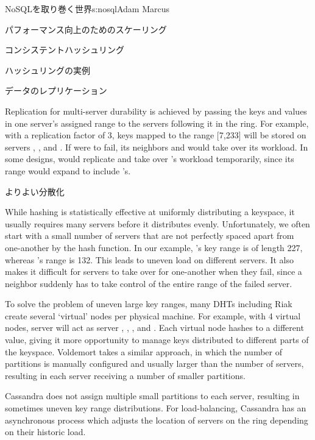 \begin{aosachapter}{NoSQLを取り巻く世界}{s:nosql}{Adam Marcus}
\begin{aosasect1}{パフォーマンス向上のためのスケーリング}
\begin{aosasect2}{コンシステントハッシュリング}
\begin{aosasect3}{ハッシュリングの実例}
\end{aosasect3}

\begin{aosasect3}{データのレプリケーション}

Replication for multi-server durability is achieved by passing the
keys and values in one server's assigned range to the servers
following it in the ring.  For example, with a replication factor of
3, keys mapped to the range [7,233] will be stored on servers
, , and .  If  were to fail, its
neighbors  and  would take over its workload.  In some designs,
 would replicate and take over 's workload temporarily, 
since its range would expand to include 's.

\end{aosasect3}

\begin{aosasect3}{よりよい分散化}

While hashing is statistically effective at uniformly distributing a
keyspace, it usually requires many servers before it distributes
evenly.  Unfortunately, we often start with a small number of servers
that are not perfectly spaced apart from one-another by the hash
function.  In our example, 's key range is of length 227,
whereas 's range is 132.  This leads to uneven load on
different servers.  It also makes it difficult for servers to take
over for one-another when they fail, since a neighbor suddenly has to
take control of the entire range of the failed server.

To solve the problem of uneven large key ranges, many DHTs including
Riak create several `virtual' nodes per physical machine.  For
example, with 4 virtual nodes, server  will act as server
, , , and .  Each virtual
node hashes to a different value, giving it more opportunity to manage
keys distributed to different parts of the keyspace.  Voldemort takes
a similar approach, in which the number of partitions is manually
configured and usually larger than the number of servers, resulting in
each server receiving a number of smaller partitions.

Cassandra does not assign multiple small partitions to each server,
resulting in sometimes uneven key range distributions.  For
load-balancing, Cassandra has an asynchronous process which adjusts
the location of servers on the ring depending on their historic load.


\end{aosasect3}
\end{aosasect2}
\end{aosasect1}
\end{aosachapter}
